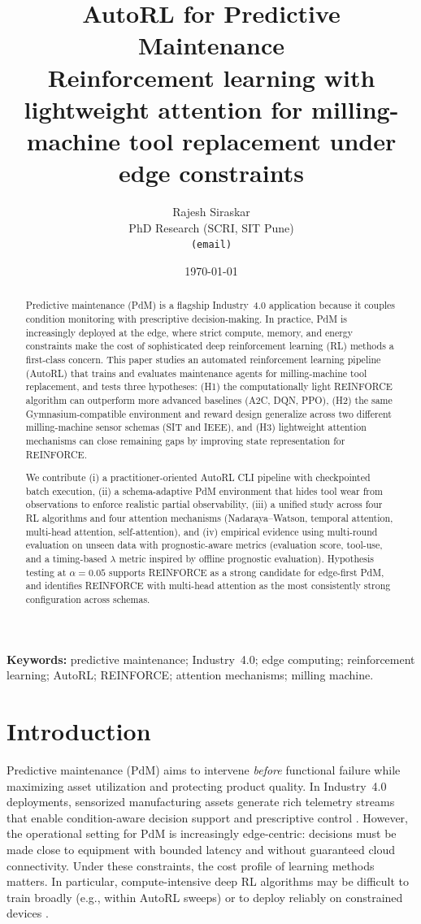 \documentclass[11pt]{article}
\title{AutoRL for Predictive Maintenance\\\large Reinforcement learning with lightweight attention for milling-machine tool replacement under edge constraints}
\author{Rajesh Siraskar\\\small PhD Research (SCRI, SIT Pune)\\\small \texttt{(email)}}
\date{\today}
\begin{document}
\maketitle

\begin{abstract}
Predictive maintenance (PdM) is a flagship Industry~4.0 application because it couples condition monitoring with prescriptive decision-making. In practice, PdM is increasingly deployed at the edge, where strict compute, memory, and energy constraints make the cost of sophisticated deep reinforcement learning (RL) methods a first-class concern. This paper studies an automated reinforcement learning pipeline (AutoRL) that trains and evaluates maintenance agents for milling-machine tool replacement, and tests three hypotheses: (H1) the computationally light REINFORCE algorithm can outperform more advanced baselines (A2C, DQN, PPO), (H2) the same Gymnasium-compatible environment and reward design generalize across two different milling-machine sensor schemas (SIT and IEEE), and (H3) lightweight attention mechanisms can close remaining gaps by improving state representation for REINFORCE.

We contribute (i) a practitioner-oriented AutoRL CLI pipeline with checkpointed batch execution, (ii) a schema-adaptive PdM environment that hides tool wear from observations to enforce realistic partial observability, (iii) a unified study across four RL algorithms and four attention mechanisms (Nadaraya--Watson, temporal attention, multi-head attention, self-attention), and (iv) empirical evidence using multi-round evaluation on unseen data with prognostic-aware metrics (evaluation score, tool-use, and a timing-based $\lambda$ metric inspired by offline prognostic evaluation). Hypothesis testing at $\alpha=0.05$ supports REINFORCE as a strong candidate for edge-first PdM, and identifies REINFORCE with multi-head attention as the most consistently strong configuration across schemas.
\end{abstract}

\textbf{Keywords:} predictive maintenance; Industry~4.0; edge computing; reinforcement learning; AutoRL; REINFORCE; attention mechanisms; milling machine.

\section{Introduction}
\label{sec:intro}
Predictive maintenance (PdM) aims to intervene \emph{before} functional failure while maximizing asset utilization and protecting product quality. In Industry~4.0 deployments, sensorized manufacturing assets generate rich telemetry streams that enable condition-aware decision support and prescriptive control \parencite{Zonta2020PdM, Compare2020IoT}. However, the operational setting for PdM is increasingly edge-centric: decisions must be made close to equipment with bounded latency and without guaranteed cloud connectivity. Under these constraints, the cost profile of learning methods matters. In particular, compute-intensive deep RL algorithms may be difficult to train broadly (e.g., within AutoRL sweeps) or to deploy reliably on constrained devices \parencite{Njor2024TinyML, Pandey2023EdgeDNN}.
\end{document}
